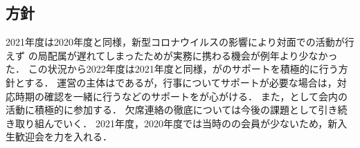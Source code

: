 \subsection*{\newGradeIfKouki{}\thirdGrade{}方針}

2021年度は2020年度と同様，新型コロナウイルスの影響により対面での活動が行えず
\firstGrade{}の局配属が遅れてしまったため\firstGrade{}が実務に携わる機会が例年より少なかった．
この状況から2022年度は2021年度と同様，\newGradeIfKouki{}\thirdGrade{}が\newGradeIfKouki{}\secondGrade{}のサポートを積極的に行う方針とする．
運営の主体は\newGradeIfKouki{}\secondGrade{}であるが，行事についてサポートが必要な場合は，対応時期の確認を一緒に行うなどのサポートを\newGradeIfKouki{}\thirdGrade{}が心がける．
また，\newGradeIfKouki{}\thirdGrade{}として会内の活動に積極的に参加する．
欠席連絡の徹底については今後の課題として引き続き取り組んでいく．
2021年度，2020年度では当時の\firstGrade{}の会員が少ないため，新入生歓迎会を力を入れる．
